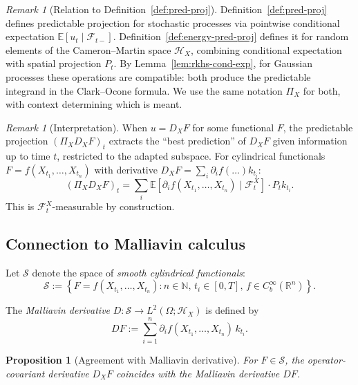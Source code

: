 \documentclass[11pt,a4paper]{article}
\theoremstyle{plain}
\newtheorem{proposition}[theorem]{Proposition}
\theoremstyle{definition}
\theoremstyle{remark}
\newtheorem{remark}[theorem]{Remark}
\newcommand{\R}{\mathbb{R}}
\newcommand{\N}{\mathbb{N}}
\newcommand{\E}{\mathbb{E}}
\newcommand{\Lp}[1]{L^{#1}}
\newcommand{\Ft}{\mathcal{F}_t}
\newcommand{\Fminus}{\mathcal{F}_{t-}}
\newcommand{\HX}{\mathcal{H}_X}
\begin{document}
\begin{remark}[Relation to Definition~\ref{def:pred-proj}]\label{rem:two-projections}
Definition~\ref{def:pred-proj} defines predictable projection for stochastic processes via pointwise conditional expectation $\E[u_t \mid \Fminus]$. Definition~\ref{def:energy-pred-proj} defines it for random elements of the Cameron--Martin space $\HX$, combining conditional expectation with spatial projection $P_t$. By Lemma~\ref{lem:rkhs-cond-exp}, for Gaussian processes these operations are compatible: both produce the predictable integrand in the Clark--Ocone formula. We use the same notation $\Pi_X$ for both, with context determining which is meant.
\end{remark}

\begin{remark}[Interpretation]\label{rem:proj-interpretation}
When $u = D_X F$ for some functional $F$, the predictable projection $(\Pi_X D_X F)_t$ extracts the ``best prediction'' of $D_X F$ given information up to time $t$, restricted to the adapted subspace. For cylindrical functionals $F = f(X_{t_1}, \ldots, X_{t_n})$ with derivative $D_X F = \sum_i \partial_i f(\ldots) k_{t_i}$:
\[
(\Pi_X D_X F)_t = \sum_i \E[\partial_i f(X_{t_1}, \ldots, X_{t_n}) \mid \Ft^X] \cdot P_t k_{t_i}.
\]
This is $\Ft^X$-measurable by construction.
\end{remark}

\subsection{Connection to Malliavin calculus}

Let $\mathcal{S}$ denote the space of \emph{smooth cylindrical functionals}:
\[
\mathcal{S} := \left\{F = f(X_{t_1}, \ldots, X_{t_n}) : n \in \N, \, t_i \in [0,T], \, f \in C^\infty_b(\R^n)\right\}.
\]

The \emph{Malliavin derivative} $D: \mathcal{S} \to \Lp{2}(\Omega; \HX)$ is defined by
\begin{equation}\label{eq:malliavin-def}
DF := \sum_{i=1}^n \partial_i f(X_{t_1}, \ldots, X_{t_n}) \, k_{t_i}.
\end{equation}

\begin{proposition}[Agreement with Malliavin derivative]\label{prop:agreement}
For $F \in \mathcal{S}$, the operator-covariant derivative $D_X F$ coincides with the Malliavin derivative $DF$.
\end{proposition}
\end{document}
